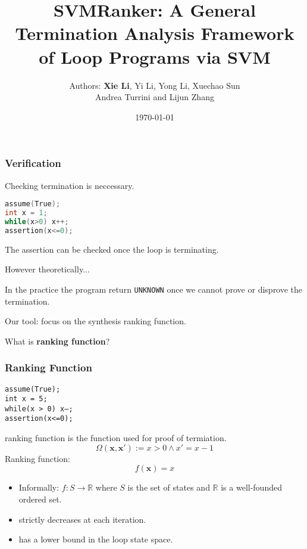 \documentclass[11pt]{beamer}
\title{SVMRanker: A General Termination Analysis Framework of Loop Programs via SVM}
\author{
    Authors: \textbf{Xie Li}, Yi Li, Yong Li, Xuechao Sun \\Andrea Turrini and Lijun Zhang
}
\date{\today}
\begin{document}
\maketitle

\begin{frame}[fragile]\frametitle{Verification}
Checking termination is neccessary.
\begin{example}
\begin{minipage}{\linewidth}
\begin{lstlisting}[language=C++,
    xleftmargin=.3\textwidth, 
    xrightmargin=.3\textwidth]
assume(True);
int x = 1;
while(x>0) x++;
assertion(x<=0);
\end{lstlisting}
\end{minipage}
\end{example}
The assertion can be checked once the loop is terminating.


However theoretically...

In the practice the program return \texttt{UNKNOWN} once we cannot prove or disprove the termination.

Our tool: focus on the synthesis ranking function.

What is \textbf{ranking function}?
\end{frame}



\begin{frame}[fragile]\frametitle{Ranking Function}
\begin{multicols}{2}
\begin{minipage}{\linewidth}

\texttt{assume(True);}\\
\texttt{int x = 5;}\\
\texttt{while(x > 0) x--;}\\
\texttt{assertion(x<=0);}\\
\end{minipage}

ranking function is the function used for proof of termiation.
\[\Omega(\mathbf{x}, \mathbf{x}') := x > 0 \wedge x' = x - 1 \]
Ranking function: 
\[f(\mathbf{x}) = x\]

\begin{itemize}
\item Informally: $f: S\rightarrow \mathbb{R}$ where $S$ is the set of states and $\mathbb{R}$ is a well-founded ordered set.

\item strictly decreases at each iteration.

\item has a lower bound in the loop state space.

\end{itemize}

\end{multicols}
\end{frame}
\end{document}
